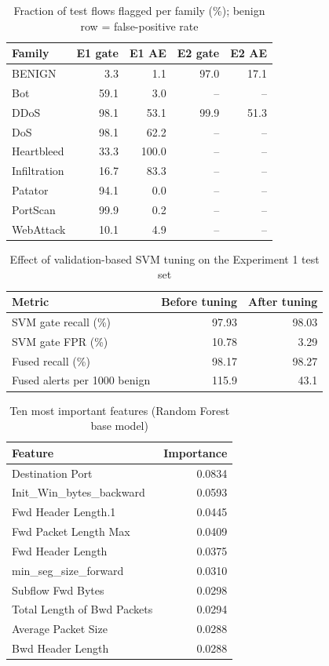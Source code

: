 \begin{table}[!htbp]
\centering
\caption{Fraction of test flows flagged per family (\%); benign row = false-positive rate}
\label{tab:detfamily}
\small
\begin{tabular}{@{}lrrrr@{}}
\toprule
\textbf{Family} & \textbf{E1 gate} & \textbf{E1 AE} & \textbf{E2 gate} & \textbf{E2 AE} \\
\midrule
BENIGN & 3.3 & 1.1 & 97.0 & 17.1 \\
Bot & 59.1 & 3.0 & -- & -- \\
DDoS & 98.1 & 53.1 & 99.9 & 51.3 \\
DoS & 98.1 & 62.2 & -- & -- \\
Heartbleed & 33.3 & 100.0 & -- & -- \\
Infiltration & 16.7 & 83.3 & -- & -- \\
Patator & 94.1 & 0.0 & -- & -- \\
PortScan & 99.9 & 0.2 & -- & -- \\
WebAttack & 10.1 & 4.9 & -- & -- \\
\bottomrule
\end{tabular}
\end{table}
\begin{table}[!htbp]
\centering
\caption{Effect of validation-based SVM tuning on the Experiment 1 test set}
\label{tab:tuningeffect}
\small
\begin{tabular}{@{}lrr@{}}
\toprule
\textbf{Metric} & \textbf{Before tuning} & \textbf{After tuning} \\
\midrule
SVM gate recall (\%) & 97.93 & 98.03 \\
SVM gate FPR (\%) & 10.78 & 3.29 \\
Fused recall (\%) & 98.17 & 98.27 \\
Fused alerts per 1000 benign & 115.9 & 43.1 \\
\bottomrule
\end{tabular}
\end{table}
\begin{table}[!htbp]
\centering
\caption{Ten most important features (Random Forest base model)}
\label{tab:features}
\small
\begin{tabular}{@{}lr@{}}
\toprule
\textbf{Feature} & \textbf{Importance} \\
\midrule
Destination Port & 0.0834 \\
Init\_Win\_bytes\_backward & 0.0593 \\
Fwd Header Length.1 & 0.0445 \\
Fwd Packet Length Max & 0.0409 \\
Fwd Header Length & 0.0375 \\
min\_seg\_size\_forward & 0.0310 \\
Subflow Fwd Bytes & 0.0298 \\
Total Length of Bwd Packets & 0.0294 \\
Average Packet Size & 0.0288 \\
Bwd Header Length & 0.0288 \\
\bottomrule
\end{tabular}
\end{table}
